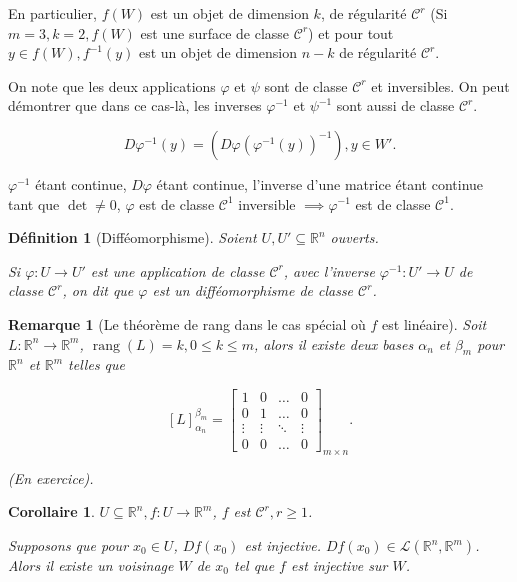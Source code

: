 \documentclass[french]{article}
\newtheorem{definition}{Définition}[section]
\newtheorem*{remark}{Remarque}
\newtheorem*{corollary}{Corollaire}
\begin{document}
En particulier, $f(W)$ est un objet de dimension $k$, de régularité $\mathcal{C}^r$ (Si $m=3, k=2, f(W)$ est une surface de classe $\mathcal{C}^r$) et pour tout $y \in f(W), f ^{-1} (y)$ est un objet de dimension $n-k$ de régularité $\mathcal{C}^r$.

On note que les deux applications $\varphi$ et $\psi$ sont de classe $\mathcal{C}^r$ et inversibles. On peut démontrer que dans ce cas-là, les inverses $\varphi ^{-1} $ et $\psi ^{-1} $ sont aussi de classe $\mathcal{C}^r$.

\[
D \varphi ^{-1} (y) = (D \varphi (\varphi ^{-1} (y))^{-1} ), y \in W'.
\]

$\varphi ^{-1} $ étant continue, $D \varphi$ étant continue, l'inverse d'une matrice étant continue tant que $\operatorname{det} \neq 0$, $\varphi$ est de classe $\mathcal{C}^1$ inversible $\implies \varphi ^{-1} $ est de classe $\mathcal{C}^1$.

\begin{definition}[Difféomorphisme]
  Soient $U, U' \subseteq \mathbb{R}^n$ ouverts.

  Si $\varphi : U \to U'$ est une application de classe $\mathcal{C}^r$, avec l'inverse $\varphi ^{-1} : U' \to U$ de classe $\mathcal{C}^r$, on dit que $\varphi$ est un difféomorphisme de classe $\mathcal{C}^r$.
\end{definition}

\begin{remark}[Le théorème de rang dans le cas spécial où $f$ est linéaire]
  Soit $L : \mathbb{R}^n \to \mathbb{R}^m$, $\operatorname{rang}(L) = k, 0 \leq k \leq m$, alors il existe deux bases $\alpha_n$ et $\beta_m$ pour $\mathbb{R}^n$ et $\mathbb{R}^m$ telles que

  \[
  [L] _{\alpha_n} ^{\beta_m} =  \left[\begin{matrix}
    1 & 0 & \dots & 0 \\
    0 & 1 & \dots & 0 \\
    \vdots & \vdots & \ddots & \vdots \\
    0 & 0 & \dots & 0
  \end{matrix}\right] _{m \times n}.
  \]

  (En exercice).
\end{remark}

\begin{corollary}\label{inj}
  $U \subseteq \mathbb{R}^n, f : U \to \mathbb{R}^m$, $f$ est $\mathcal{C}^r, r \geq 1$.

  Supposons que pour $x_0 \in U$, $Df(x_0)$ est injective. $Df(x_0) \in \mathscr{L}(\mathbb{R}^n, \mathbb{R}^m) $. Alors il existe un voisinage $W$ de $x_0$ tel que $f$ est injective sur $W$.
\end{corollary}
\end{document}
